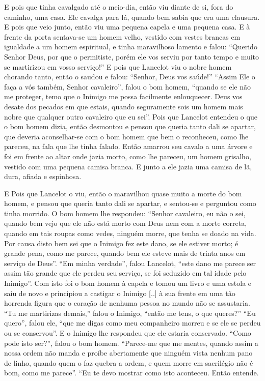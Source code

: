 E pois que tinha cavalgado até o meio-dia, então viu diante de si, fora do
caminho, uma casa. Ele cavalga para lá, quando bem sabia que era uma clausura.
E pois que veio junto, então viu uma pequena capela e uma pequena casa. E à
frente da porta sentava-se um homem velho, vestido com vestes brancas em
igualdade a um homem espiritual, e tinha maravilhoso lamento e falou: “Querido
Senhor Deus, por que o permitiste, porém ele vos serviu por tanto tempo e muito
se martirizou em vosso serviço!” E pois que Lancelot viu o nobre homem
chorando tanto, então o saudou e falou: “Senhor, Deus vos saúde!” “Assim Ele o
faça a vós também, Senhor cavaleiro”, falou o bom homem, “quando se ele não me
proteger, temo que o Inimigo me possa facilmente enlouquecer. Deus vos desate
dos pecados em que estais, quando seguramente sois um homem mais nobre que
qualquer outro cavaleiro que eu sei”. Pois que Lancelot entendeu o que o bom
homem dizia, então desmontou e pensou que queria tanto dali se apartar, que
deveria aconselhar-se com o bom homem que bem o reconheceu, como lhe pareceu,
na fala que lhe tinha falado. Então amarrou seu cavalo a uma árvore e foi em
frente ao altar onde jazia morto, como lhe pareceu, um homem grisalho, vestido com
uma pequena camisa branca. E junto a ele jazia uma camisa de lã, dura, afiada e
espinhosa. 

E Pois que Lancelot o viu, então o maravilhou quase muito a morte do bom
homem, e pensou que queria tanto dali se apartar, e sentou-se e perguntou como
tinha morrido. O bom homem lhe respondeu: “Senhor cavaleiro, eu não o sei,
quando bem vejo que ele não está morto com Deus nem com a morte correta, quando
em tais roupas como vedes, ninguém morre, que tenha se doado na vida. Por causa
disto bem sei que o Inimigo fez este dano, se ele estiver morto; é grande pena,
como me parece, quando bem ele esteve mais de trinta anos em serviço de Deus”.
“Em minha verdade”, falou Lancelot, “este dano me parece ser assim tão grande
que ele perdeu seu serviço, se foi seduzido em tal idade pelo Inimigo”. Com
isto foi o bom homem à capela e tomou um livro e uma estola e saiu de novo e
principiou a castigar o Inimigo [..] à sua frente em uma tão horrenda figura
que o coração de nenhuma pessoa no mundo não se assustaria. “Tu me martirizas
demais,” falou o Inimigo, “então me tens, o que queres?” “Eu quero”, falou
ele, “que me digas como meu companheiro morreu e se ele se perdeu ou se
conservou”. E o Inimigo lhe respondeu que ele estaria conservado. “Como pode
isto ser?”, falou o bom homem. “Parece-me que me mentes, quando assim a nossa
ordem não manda e proíbe abertamente que ninguém vista nenhum pano de linho,
quando quem o faz quebra a ordem, e quem morre em sacrilégio não é bom, como me
parece”. “Eu te devo mostrar como isto aconteceu. Então entende.

